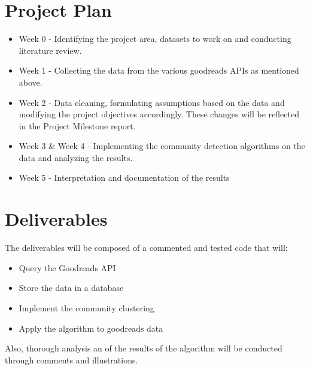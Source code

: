 \documentclass[11pt]{article}
\begin{document}
\section{Project Plan}
\begin{itemize}
\item Week 0 - Identifying the project area, datasets to work on and conducting literature review.
\item Week 1 -  Collecting the data from the various goodreads APIs as mentioned above.
\item Week 2 -  Data cleaning, formulating assumptions based on the data and modifying the project objectives accordingly. These changes will be reflected in the Project Milestone report.
\item Week 3 \& Week 4 - Implementing the community detection algorithms on the data and analyzing the results.
\item Week 5 - Interpretation and documentation of the results
\end{itemize}
\section{Deliverables}

The deliverables will be composed of a commented and tested code that will:
\begin{itemize}
\item Query the Goodreads API
\item Store the data in a database
\item Implement the community clustering
\item Apply the algorithm to goodreads data
\end{itemize}

Also, thorough analysis an of the results of the algorithm will be conducted through comments and illustrations.

\newpage



\end{document}

